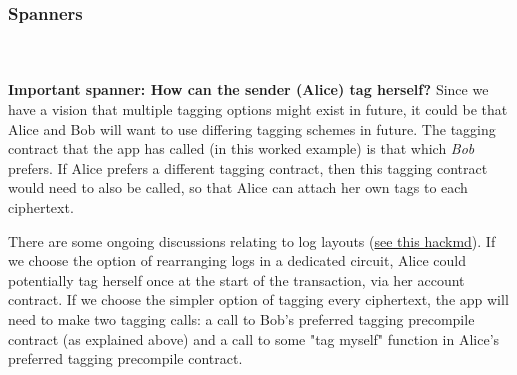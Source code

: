 \subsubsection{Spanners}\hfill\\
\\
\textbf{Important spanner: How can the sender (Alice) tag herself?} Since we have a vision that multiple tagging options might exist in future, it could be that Alice and Bob will want to use differing tagging schemes in future.
The tagging contract that the app has called (in this worked example) is that which \textit{Bob} prefers.
If Alice prefers a different tagging contract, then this tagging contract would need to also be called, so that Alice can attach her own tags to each ciphertext.

There are some ongoing discussions relating to log layouts (\href{https://hackmd.io/@aztec-network/S1CL7uZIA?type=view#Tx-Log-Layouts}{see this hackmd}).
If we choose the option of rearranging logs in a dedicated circuit, Alice could potentially tag herself once at the start of the transaction, via her account contract.
If we choose the simpler option of tagging every ciphertext, the app will need to make two tagging calls: a call to Bob's preferred tagging precompile contract (as explained above) and a call to some "tag myself" function in Alice's preferred tagging precompile contract.

